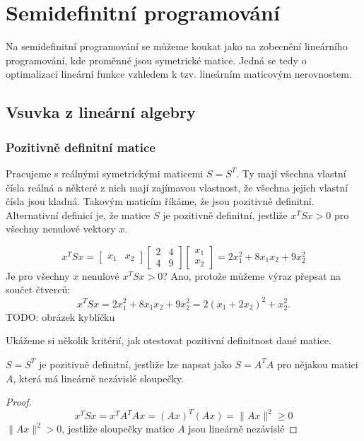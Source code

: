 \chapter{Semidefinitní programování}

Na semidefinitní programování se můžeme koukat jako na zobecnění lineárního programování, kde proměnné jsou symetrické matice. Jedná se tedy o optimalizaci lineární funkce vzhledem k tzv. lineárním maticovým nerovnostem.

\section{Vsuvka z lineární algebry}

\subsection*{Pozitivně definitní matice}

Pracujeme s reálnými symetrickými maticemi $S = S^T$. Ty mají všechna vlastní čísla reálná a některé z nich mají zajímavou vlastnost, že všechna jejich vlastní čísla jsou kladná. Takovým maticím říkáme, že jsou pozitivně definitní. Alternativní definicí je, že matice $S$ je pozitivně definitní, jestliže $x^TSx > 0$ pro všechny nenulové vektory $x$.

\begin{pr}
$$
    x^T S x = 
    \begin{bmatrix}
        x_1 & x_2
    \end{bmatrix}
    \begin{bmatrix}
        2 & 4 \\
        4 & 9
    \end{bmatrix}
    \begin{bmatrix}
        x_1 \\
        x_2
    \end{bmatrix} =
    2 x_1^2 + 8 x_1 x_2 + 9 x_2^2
$$
Je pro všechny $x$ nenulové $x^TSx > 0$? Ano, protože můžeme výraz přepsat na součet čtverců:
$$
    x^TSx = 2 x_1^2 + 8 x_1 x_2 + 9 x_2^2 = 2 (x_1 + 2 x_2)^2 + x_2^2.
$$
TODO: obrázek kyblíčku
\end{pr}

Ukážeme si několik kritérií, jak otestovat pozitivní definitnost dané matice.

\begin{vt}
    $S = S^T$ je pozitivně definitní, jestliže lze napsat jako $S = A^T A$ pro nějakou matici $A$, která má lineárně nezávislé sloupečky.
\end{vt}
\begin{proof}
    \begin{equation}
    \label{eq:tmp}
        x^TSx = x^TA^TAx = (Ax)^T(Ax) = \lVert Ax \rVert^2 \geq 0
    \end{equation}
    $\lVert Ax \rVert^2 > 0$, jestliže sloupečky matice $A$ jsou lineárně nezávislé
\end{proof}

